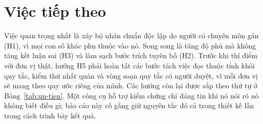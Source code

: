 \section{Việc tiếp theo}

Việc quan trọng nhất là xây bộ nhãn chuẩn độc lập do người có chuyên môn gán (H1), vì mọi con số khác phụ thuộc vào nó. Song song là tăng độ phủ mà không tăng kết luận sai (H3) và làm sạch bước trích tuyên bố (H2). Trước khi thí điểm với đơn vị thật, hướng H5 phải hoàn tất các bước tách việc đọc thuộc tính khỏi quy tắc, kiểm thử nhất quán và vòng soạn quy tắc có người duyệt, vì mỗi đơn vị sẽ mang theo quy ước riêng của mình. Các hướng còn lại được sắp theo thứ tự ở Bảng~\ref{tab:uu-tien}. Một công cụ hỗ trợ kiểm chứng chỉ đáng tin khi nó nói rõ nó không biết điều gì; báo cáo này cố gắng giữ nguyên tắc đó cả trong thiết kế lẫn trong cách trình bày kết quả.
